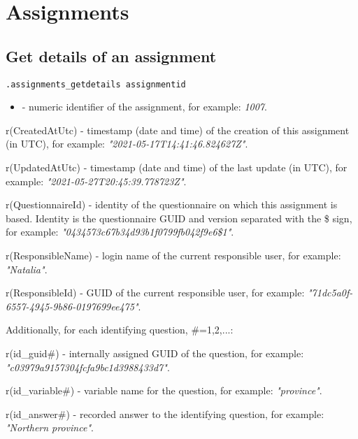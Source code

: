 \section{Assignments}

\subsection{Get details of an assignment}

\begin{lstlisting}[style=CommandLineStyle]
.assignments_getdetails assignmentid
\end{lstlisting}

\paramsheader
\begin{itemize}
    \item {} - numeric identifier of the assignment, for
    example: \textit{1007}.
\end{itemize}

\savedres
\begin{compactitem}
    \item r(CreatedAtUtc) - timestamp (date and time) of the creation of this
    assignment (in UTC), for example: \textit{"2021-05-17T14:41:46.824627Z"}.
    \item r(UpdatedAtUtc) - timestamp (date and time) of the last update (in
    UTC), for example: \textit{"2021-05-27T20:45:39.778723Z"}.
    \item r(QuestionnaireId)  - identity of the questionnaire on which this
    assignment is based. Identity is the questionnaire GUID and version
    separated with the \$ sign, for example: \newline
    \textit{"0434573c67b34d93b1f0799fb042f9e6\$1"}.
    \item r(ResponsibleName) - login name of the current responsible user,
    for example: \textit{"Natalia"}.
    \item r(ResponsibleId) - GUID of the current responsible user, for example:
    \textit{"71dc5a0f-6557-4945-9b86-0197699ee475"}.
\end{compactitem}

\vskip16pt
Additionally, for each identifying question, \#=1,2,...:
\begin{compactitem}
    \item r(id\_guid\#) - internally assigned GUID of the question,
    for example: \newline \textit{"c03979a9157304fcfa9bc1d3988433d7"}.
    \item r(id\_variable\#) - variable name for the question,
    for example: \textit{"province"}.
    \item r(id\_answer\#) - recorded answer to the identifying question,
    for example: \textit{"Northern province"}.
\end{compactitem}

